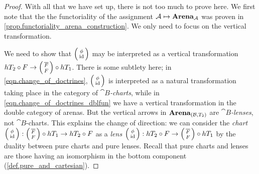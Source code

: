 \documentclass[DynamicalBook]{subfiles}
\begin{document}
\begin{proof}
  With all that we have set up, there is not too much to prove here. We first
  note that the the functoriality of the assignment $\mathcal{A} \mapsto
  \textbf{Arena}_{\mathcal{A}}$ was proven in
  \cref{prop.functoriality_arena_construction}. We only need to focus on the
  vertical transformation.

  We need to
show that $\lens{\phi}{\id}$ may be interpreted as a vertical transformation
$hT_2 \circ F \to \lens{\overline{F}}{F} \circ hT_1$. There is some subtlety
here; in \cref{eqn.change_of_doctrines}, $\lens{\phi}{\id}$ is interpreted as a
natural transformation taking place in the category of \emph{$\cat{B}$-charts}, while in
\cref{eqn.change_of_doctrines_dblfun} we have a vertical transformation in the
double category of arenas. But the vertical arrows in $\textbf{Arena}_{(\mathcal{B},
  T_2)}$ are \emph{$\cat{B}$-lenses}, not $\cat{B}$-charts. This explains the
change of direction: we can consider the \emph{chart} $\lens{\phi}{\id} :\lens{\overline{F}}{F} \circ hT_1  \to  hT_2
\circ F$ as a \emph{lens}
$\lens{\phi}{\id} : hT_2 \circ F \to \lens{\overline{F}}{F} \circ hT_1$ by the
duality between pure charts and pure lenses. Recall that pure charts and lenses are those having an isomorphism in the
bottom component (\cref{def.pure_and_cartesian}).


\end{proof}
\end{document}
